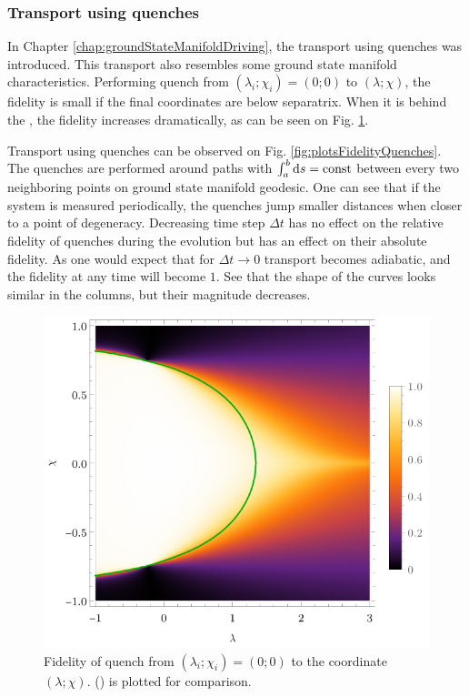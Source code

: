 \subsubsection{Transport using quenches}
In Chapter \ref{chap:groundStateManifoldDriving}, the transport using quenches was introduced. This transport also resembles some ground state manifold characteristics. Performing quench from $(\lambda_i;\chi_i)=(0;0)$ to $(\lambda;\chi)$, the fidelity is small if the final coordinates are below separatrix. When it is behind the , the fidelity increases dramatically, as can be seen on Fig. \ref{fig:quenchFidelityFrom00}.

Transport using quenches can be observed on Fig. \ref{fig:plotsFidelityQuenches}. The quenches are performed around paths with $\int_{a}^{b} \mathrm{d} s=\text{const}$ between every two neighboring points on ground state manifold geodesic. One can see that if the system is measured periodically, the quenches jump smaller distances when closer to a point of degeneracy. Decreasing time step $\Delta t$ has no effect on the relative fidelity of quenches during the evolution but has an effect on their absolute fidelity. As one would expect that for $\Delta t\rightarrow 0$ transport becomes adiabatic, and the fidelity at any time will become $1$. See that the shape of the curves looks similar in the columns, but their magnitude decreases.

\begin{figure}[H]
    \centering
    \includegraphics[scale=1.2]{../img/quenchFidelityFrom00.pdf}
    \caption{Fidelity of quench from $(\lambda_i;\chi_i)=(0;0)$ to the coordinate $(\lambda;\chi)$.  () is plotted for comparison.}
    \label{fig:quenchFidelityFrom00}    
\end{figure}

